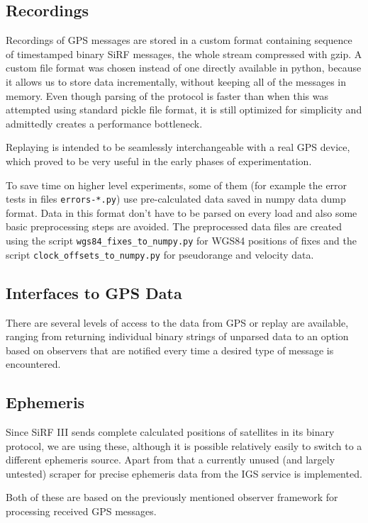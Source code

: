 \subsection{Recordings}
Recordings of GPS messages are stored in a custom format containing sequence
of timestamped binary SiRF messages, the whole stream compressed with gzip.
A custom file format was chosen instead of one directly available in python,
because it allows us to store data incrementally, without keeping all of the
messages in memory.
Even though parsing of the protocol is faster than when this was attempted
using standard pickle file format, it is still optimized for simplicity
and admittedly creates a performance bottleneck.

Replaying is intended to be seamlessly interchangeable with a real GPS device,
which proved to be very useful in the early phases of experimentation.

To save time on higher level experiments, some of them (for example the error tests
in files \verb=errors-*.py=)
use pre-calculated data saved in numpy data dump format.
Data in this format don't have to be parsed on every load and also some basic
preprocessing steps are avoided.
The preprocessed data files are created using the script \verb=wgs84_fixes_to_numpy.py=
for WGS84 positions of fixes and the script \verb=clock_offsets_to_numpy.py= for pseudorange
and velocity data.

\subsection{Interfaces to GPS Data}
There are several levels of access to the data from GPS or replay are available,
ranging from returning individual binary strings of unparsed data to an option based
on observers that are notified every time a desired type of message is encountered.

\subsection{Ephemeris}
Since SiRF III sends complete calculated positions of satellites in its binary
protocol, we are using these, although it is possible relatively easily to switch
to a different ephemeris source.
Apart from that a currently unused (and largely untested) scraper for precise
ephemeris data from the IGS service \cite{orbit-data} is implemented.

Both of these are based on the previously mentioned observer framework for processing
received GPS messages.

